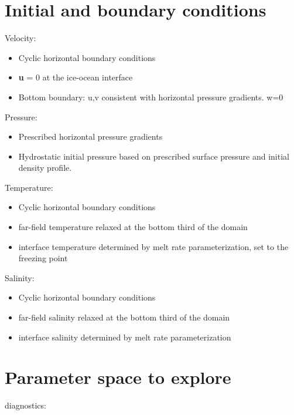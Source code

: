 \documentclass[letterpaper,10pt]{report}
\begin{document}
	\newpage
	\section{Initial and boundary conditions}
	
	Velocity:
	\begin{itemize}
	\item Cyclic horizontal boundary conditions
	\item \textbf{u} = 0 at the ice-ocean interface
	\item Bottom boundary: u,v consistent with horizontal pressure gradients. w=0
	\end{itemize}
	
	Pressure:
	\begin{itemize}
	\item Prescribed horizontal pressure gradients
	\item Hydrostatic initial pressure based on prescribed surface pressure and initial density profile.
	\end{itemize}
	
	Temperature:
	\begin{itemize}
	    \item Cyclic horizontal boundary conditions
	    \item far-field temperature relaxed at the bottom third of the domain
	    \item interface temperature determined by melt rate parameterization, set to the freezing point
	\end{itemize}
	
	Salinity:
    \begin{itemize}
	    \item Cyclic horizontal boundary conditions
	    \item far-field salinity relaxed at the bottom third of the domain
	    \item interface salinity determined by melt rate parameterization
	\end{itemize}
	
	\newpage
	
	\section{Parameter space to explore}
	

diagnostics:
\end{document}
